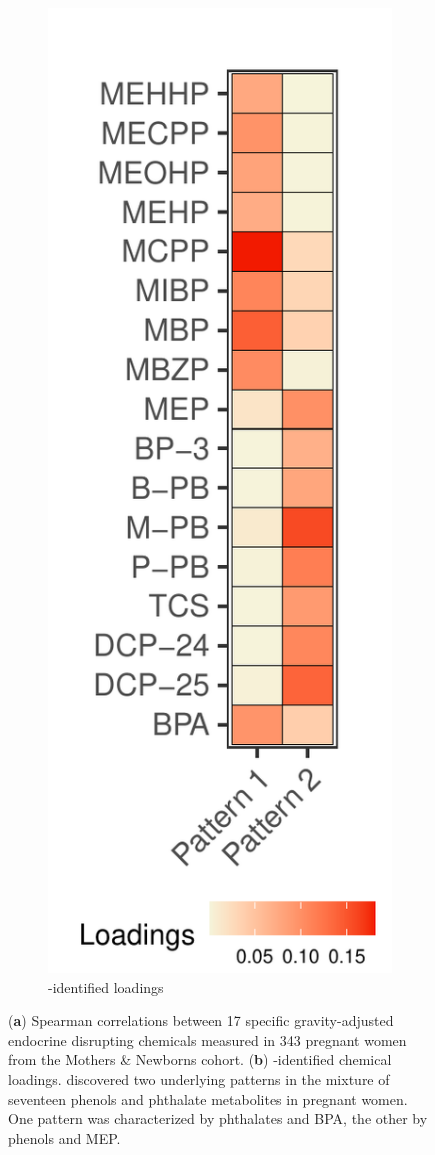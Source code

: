 \begin{landscape}
\begin{figure}
\begin{subfigure}[b]{0.3\textwidth}
\includegraphics[scale = 0.69]{./figures/eh_loadings.pdf}
\caption{\bnmfc-identified loadings}
\label{fig:load}
\end{subfigure}
\hfill
\caption[Intra-chemical correlations and \bnmfc-identified chemical loadings]{(\textbf{a}) Spearman correlations between 17 specific gravity-adjusted endocrine disrupting chemicals measured in 343 pregnant women from the Mothers \& Newborns cohort. (\textbf{b}) \bnmfc-identified chemical loadings. \bnmf discovered two underlying patterns in the mixture of seventeen phenols and phthalate metabolites in pregnant women. One pattern was characterized by phthalates and BPA, the other by phenols and MEP.}
\end{figure}
\end{landscape}

